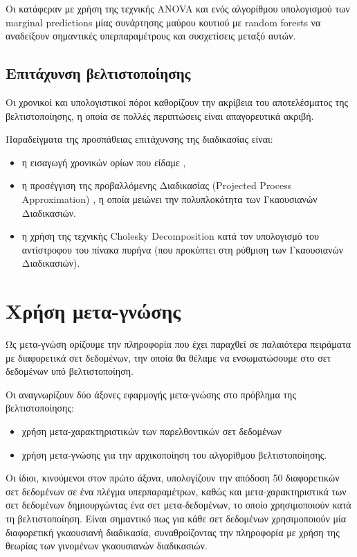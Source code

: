 \documentclass[]{article}
\numberwithin{equation}{section}		%
\numberwithin{figure}{section}			%
\numberwithin{table}{section}				%
\begin{document}
	Οι \citet{HutHooLey14:fanova} κατάφεραν με χρήση της τεχνικής ANOVA και ενός αλγορίθμου υπολογισμού των marginal predictions μίας συνάρτησης μαύρου κουτιού με random forests να αναδείξουν σημαντικές υπερπαραμέτρους και συσχετίσεις μεταξύ αυτών.
	
	\subsection{Επιτάχυνση βελτιστοποίησης}
	Οι χρονικοί και υπολογιστικοί πόροι καθορίζουν την ακρίβεια του αποτελέσματος της βελτιστοποίησης, η οποία σε πολλές περιπτώσεις είναι απαγορευτικά ακριβή. 
	
	Παραδείγματα της προσπάθειας επιτάχυνσης της διαδικασίας είναι:
	\begin{itemize}
		\item η εισαγωγή χρονικών ορίων που είδαμε \citep{HutHooLeyMur10}, 
		\item η προσέγγιση της προβαλλόμενης Διαδικασίας (Projected Process Approxima\-tion) \citep{HutHooLeyMur10}, η οποία μειώνει την πολυπλοκότητα των Γκαουσιανών Διαδικασιών.
		\item η χρήση της τεχνικής Cholesky Decomposition \citep{Schilling2016} κατά τον υπολογισμό του αντίστροφου του πίνακα πυρήνα (που προκύπτει στη ρύθμιση των Γκαουσιανών Διαδικασιών).
	\end{itemize} 
	\section{Χρήση μετα-γνώσης}
    Ως μετα-γνώση ορίζουμε την πληροφορία που έχει παραχθεί σε παλαιότερα πειράματα με διαφορετικά σετ δεδομένων, την οποία θα θέλαμε να ενσωματώσουμε στο σετ δεδομένων υπό βελτιστοποίηση.
    
    Οι \citet{Schilling2016} αναγνωρίζουν δύο άξονες εφαρμογής μετα-γνώσης στο πρόβλημα της βελτιστοποίησης:
    \begin{itemize}
    	\item χρήση μετα-χαρακτηριστικών των παρελθοντικών σετ δεδομένων
    	\item χρήση μετα-γνώσης για την αρχικοποίηση του αλγορίθμου βελτιστοποίησης. \citep{AAAI1510029}
    \end{itemize}
    Οι ίδιοι, κινούμενοι στον πρώτο άξονα, υπολογίζουν την απόδοση 50 διαφορετικών σετ δεδομένων σε ένα πλέγμα υπερπαραμέτρων, καθώς και μετα-χαρακτηριστικά των σετ δεδομένων δημιουργώντας ένα σετ μετα-δεδομένων, το οποίο χρησιμοποιούν κατά τη βελτιστοποίηση. Είναι σημαντικό πως για κάθε σετ δεδομένων χρησιμοποιούν μία διαφορετική γκαουσιανή διαδικασία, συναθροίζοντας  την πληροφορία με χρήση της θεωρίας των γινομένων γκαουσιανών διαδικασιών.
    \nocite{*}
    \printbibliography[title= Βιβλιογραφία]
\end{document}
